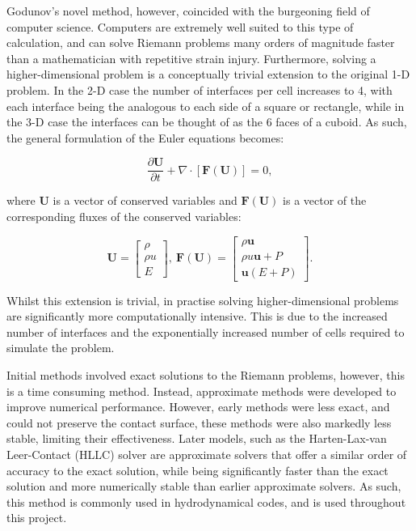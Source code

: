 Godunov's novel method, however, coincided with the burgeoning field of computer science.
Computers are extremely well suited to this type of calculation, and can solve Riemann problems many orders of magnitude faster than a mathematician with repetitive strain injury.
Furthermore, solving a higher-dimensional problem is a conceptually trivial extension to the original 1-D problem.
In the 2-D case the number of interfaces per cell increases to 4, with each interface being the analogous to each side of a square or rectangle, while in the 3-D case the interfaces can be thought of as the 6 faces of a cuboid.
As such, the general formulation of the Euler equations becomes:

\begin{equation}
  \frac{\partial \mathbf{U}}{\partial t} + \nabla \cdot \left[ \mathbf{F}(\mathbf{U}) \right] = 0 ,
\end{equation}

\noindent
where $\mathbf{U}$ is a vector of conserved variables and $\mathbf{F}(\mathbf{U})$ is a vector of the corresponding fluxes of the conserved variables:

\begin{equation}
  \mathbf{U} = 
  \begin{bmatrix}
    \rho \\
    \rho u \\
    E
  \end{bmatrix}
  , ~
  \mathbf{F}(\mathbf{U}) =
  \begin{bmatrix}
    \rho \boldsymbol{u} \\
    \rho u \boldsymbol{u} + P \\
    \boldsymbol{u}(E + P)
  \end{bmatrix} .
\end{equation}

\noindent
Whilst this extension is trivial, in practise solving higher-dimensional problems are significantly more computationally intensive.
This is due to the increased number of interfaces and the exponentially increased number of cells required to simulate the problem.


Initial methods involved exact solutions to the Riemann problems, however, this is a time consuming method.
Instead, approximate methods were developed to improve numerical performance.
However, early methods were less exact, and could not preserve the contact surface, these methods were also markedly less stable, limiting their effectiveness.
Later models, such as the Harten-Lax-van Leer-Contact (HLLC) solver \parencite{toroRestorationContactSurface1994} are approximate solvers that offer a similar order of accuracy to the exact solution, while being significantly faster than the exact solution and more numerically stable than earlier approximate solvers.
As such, this method is commonly used in hydrodynamical codes, and is used throughout this project.

